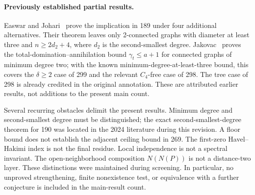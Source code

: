 \documentclass[11pt,a4paper]{article}
\theoremstyle{remark}
\begin{document}
\paragraph{Previously established partial results.}
Easwar and Johari~\cite{EaswarJohari2026} prove the implication in
189 under four additional alternatives. Their theorem leaves only
2-connected graphs with diameter at least three and $n\ge2d_2+4$,
where $d_2$ is the second-smallest degree. Jakovac~\cite{Jakovac2026}
proves the total-domination--annihilation bound $\gamma_t\le a+1$
for connected graphs of minimum degree two; with the known
minimum-degree-at-least-three bound, this covers the $\delta\ge2$
case of 299 and the relevant $C_4$-free case of 298. The tree case
of 298 is already credited in the original annotation. These are
attributed earlier results, not additions to the present main count.

Several recurring obstacles delimit the present results. Minimum degree and second-smallest degree must be distinguished;
the exact second-smallest-degree theorem for 190 was located in the
2024 literature during this revision. A floor bound does not establish the adjacent ceiling
bound in 269. The first-zero Havel--Hakimi index is not the final residue.
Local independence is not a spectral invariant. The open-neighborhood
composition $N(N(P))$ is not a distance-two layer. These distinctions were
maintained during screening. In particular, no unproved strengthening,
finite nonexistence test, or equivalence with a further conjecture is
included in the main-result count.
\end{document}
